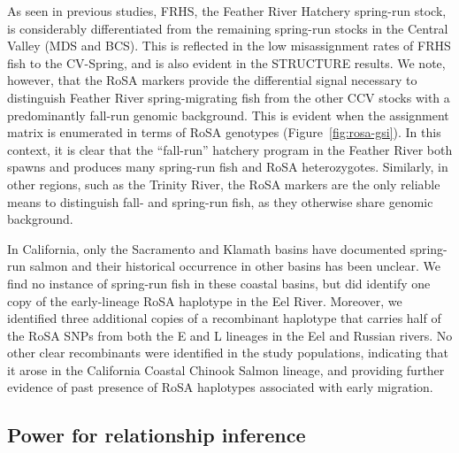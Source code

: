 As seen in previous studies, FRHS, the Feather River Hatchery
spring-run stock, is considerably differentiated from the remaining spring-run
stocks in the Central Valley (MDS and BCS). This is reflected in the low
misassignment rates of FRHS fish to the CV-Spring, and is also evident in the
STRUCTURE results.   We note, however, that the RoSA markers provide
the differential signal necessary to distinguish
Feather River spring-migrating fish from the other CCV stocks with a predominantly fall-run
genomic background. This is evident when the assignment matrix is enumerated in
terms of RoSA genotypes (Figure~\ref{fig:rosa-gsi}). In this context, it is clear that the ``fall-run'' hatchery
program in the Feather River both spawns and produces many spring-run fish and RoSA heterozygotes.
Similarly, in other regions, such as the Trinity River, the RoSA markers are the only reliable means to distinguish fall-
and spring-run fish, as they otherwise share genomic background.

In California, only the Sacramento and  Klamath basins have documented spring-run
salmon and their historical occurrence in other basins has been unclear. We find no
instance of spring-run fish in these coastal basins, but did identify one copy of the early-lineage
RoSA haplotype in the Eel River. Moreover, we identified three additional copies of a
recombinant haplotype that carries half of the RoSA SNPs from both the E and L lineages in the Eel and Russian rivers. No other clear recombinants were identified in the study populations, indicating that it arose in the California Coastal Chinook Salmon lineage, and providing further evidence of past presence of RoSA haplotypes associated with early migration.





\subsection*{Power for relationship inference}

